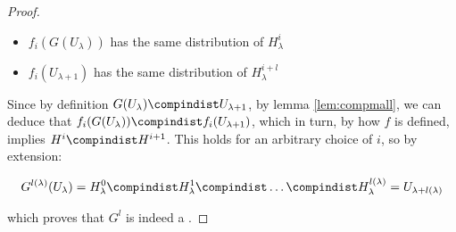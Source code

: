 \begin{proof}
    \begin{itemize}
        \item $f_{i}(G(U_{\lambda}))$ has the same distribution of $H_\lambda^{i}$
        \item $f_{i}(U_{\lambda + 1})$ has the same distribution of $H_\lambda^{i+l}$
    \end{itemize}

    Since by \prg{} definition $G(U_{\lambda}) \compindist U_{\lambda + 1}$, by lemma \ref{lem:compmall}, we can deduce that $f_{i}(G(U_{\lambda })) \compindist f_{i}(U_{\lambda + 1})$, which in turn, by how $f$ is defined, implies $H^{i} \compindist H^{i + 1}$. This holds for an arbitrary choice of $i$, so by extension:

    \begin{equation*}
        G^{l(\lambda)}(U_\lambda) = H_{\lambda}^{0} \compindist H_{\lambda}^{1} \compindist \dots \compindist H_{\lambda}^{{l(\lambda)}} = U_{\lambda + l(\lambda)}
    \end{equation*}

    which proves that $G^l$ is indeed a \prg.
\end{proof}

